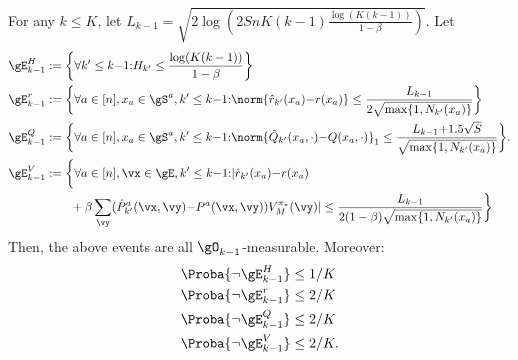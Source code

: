 \begin{lem}
    \label{lem:concentration}
    For any $k\le K$, let $L_{k-1}=\sqrt{2\log\left(2SnK(k-1)\frac{\log(K(k-1))}{1-\beta}\right)}$. Let
    \begin{align}
        \gE_{k-1}^H&:= \bigg\{\forall k'\le k{-}1{:} H_{k'}\le \frac{\log(K(k-1))}{1-\beta}\bigg\} \label{eq:conc_h}\\
        \gE_{k-1}^r&:= \bigg\{\forall a\in[n], x_a\in\gS^a, k'\le k{-}1{:} \norm{\hat{r}_{k'}(x_a){-}r(x_a)} \le \frac{L_{k-1}}{2\sqrt{\max\{1,N_{k'}(x_a)\}}}\bigg\} \label{eq:conc_r} \\
        \gE_{k-1}^Q&:= \bigg\{\forall a\in[n], x_a\in\gS^a, k'\le k{-}1{:} \norm{\hat{Q}_{k'}(x_a,\cdot){-}Q(x_a, \cdot)}_1 \le \frac{L_{k-1}{+}1.5\sqrt{S}}{\sqrt{\max\{1,N_{k'}(x_a)\}}}\bigg\}. \label{eq:conc_q} \\
        \gE_{k-1}^V&:= \bigg\{\forall a\in[n], \vx\in\gE, k'\le k{-}1{:} |\hat{r}_{k'}(x_a){-}r(x_a) \nonumber \\
                   &\qquad +\beta \sum_{\vy}(\hat{P}_{k'}^a(\vx,\vy) {-}P^a(\vx,\vy))V_M^{\pi_*}(\vy)|
        \le \frac{L_{k-1}}{2(1-\beta)\sqrt{\max\{1,N_{k'}(x_a)\}}}\bigg\} \label{eq:conc_V}
    \end{align}
    Then, the above events are all $\gO_{k-1}$-measurable. Moreover:
    \begin{align*}
        &\Proba{\lnot\gE_{k-1}^H}\le1/K \\ 
        &\Proba{\lnot \gE_{k-1}^r }\le 2/K \\
        &\Proba{\lnot \gE_{k-1}^Q }\le 2/K \\
        &\Proba{\lnot \gE_{k-1}^V }\le 2/K.
    \end{align*} 
\end{lem}

